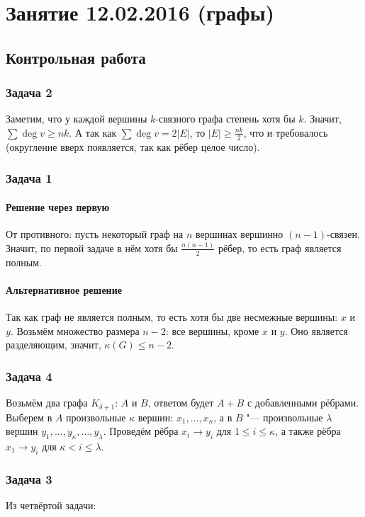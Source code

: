 \chapter{Занятие 12.02.2016 (графы)}
\section{Контрольная работа}
\subsection{Задача 2}
	Заметим, что у каждой вершины $k$-связного графа степень хотя бы $k$.
	Значит, $\sum \deg v \ge nk$.
	А так как $\sum\deg v = 2|E|$, то $|E| \ge \frac{nk}{2}$, что и требовалось
	(округление вверх появляется, так как рёбер целое число).

\subsection{Задача 1}
	\subsubsection{Решение через первую}
		От противного: пусть некоторый граф на $n$ вершинах вершинно $(n-1)$-связен.
		Значит, по первой задаче в нём хотя бы $\frac{n(n-1)}{2}$ рёбер, то есть
		граф является полным.

	\subsubsection{Альтернативное решение}
		Так как граф не является полным, то есть хотя бы две несмежные вершины: $x$ и $y$.
		Возьмём множество размера $n-2$: все вершины, кроме $x$ и $y$.
		Оно является разделяющим, значит, $\kappa(G) \le n - 2$.

\subsection{Задача 4}
	Возьмём два графа $K_{\delta+1}$: $A$ и $B$, ответом будет $A+B$ с добавленными рёбрами.
	Выберем в $A$ произвольные $\kappa$ вершин: $x_1, \dots, x_\kappa$,
	а в $B$ "--- произвольные $\lambda$ вершин $y_1, \dots, y_\kappa, \dots, y_\lambda$.
	Проведём рёбра $x_i \to y_i$ для $1 \le i \le \kappa$, а также
	рёбра $x_1 \to y_i$ для $\kappa < i \le \lambda$.
	\TODO
	
\subsection{Задача 3}
	Из четвёртой задачи:

